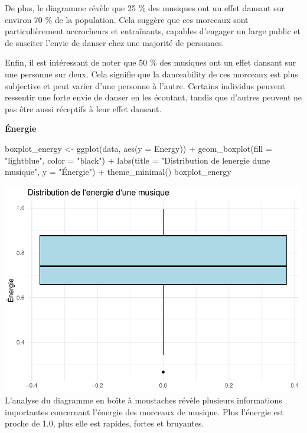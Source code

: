 \documentclass[
]{article}
\newenvironment{Shaded}{\begin{snugshade}}{\end{snugshade}}
\newcommand{\AttributeTok}[1]{\textcolor[rgb]{0.77,0.63,0.00}{#1}}
\newcommand{\FunctionTok}[1]{\textcolor[rgb]{0.00,0.00,0.00}{#1}}
\newcommand{\NormalTok}[1]{#1}
\newcommand{\OtherTok}[1]{\textcolor[rgb]{0.56,0.35,0.01}{#1}}
\newcommand{\SpecialCharTok}[1]{\textcolor[rgb]{0.00,0.00,0.00}{#1}}
\newcommand{\StringTok}[1]{\textcolor[rgb]{0.31,0.60,0.02}{#1}}
\begin{document}
De plus, le diagramme révèle que 25 \% des musiques ont un effet dansant
sur environ 70 \% de la population. Cela suggère que ces morceaux sont
particulièrement accrocheurs et entraînants, capables d'engager un large
public et de susciter l'envie de danser chez une majorité de personnes.

Enfin, il est intéressant de noter que 50 \% des musiques ont un effet
dansant sur une personne sur deux. Cela signifie que la danceability de
ces morceaux est plus subjective et peut varier d'une personne à
l'autre. Certains individus peuvent ressentir une forte envie de danser
en les écoutant, tandis que d'autres peuvent ne pas être aussi réceptifs
à leur effet dansant.

\textbf{Énergie}

\begin{Shaded}
\begin{Highlighting}[]
\NormalTok{boxplot\_energy }\OtherTok{\textless{}{-}} \FunctionTok{ggplot}\NormalTok{(data, }\FunctionTok{aes}\NormalTok{(}\AttributeTok{y =}\NormalTok{ Energy)) }\SpecialCharTok{+}
  \FunctionTok{geom\_boxplot}\NormalTok{(}\AttributeTok{fill =} \StringTok{"lightblue"}\NormalTok{, }\AttributeTok{color =} \StringTok{"black"}\NormalTok{) }\SpecialCharTok{+}
  \FunctionTok{labs}\NormalTok{(}\AttributeTok{title =} \StringTok{"Distribution de l\textquotesingle{}energie d\textquotesingle{}une musique"}\NormalTok{, }\AttributeTok{y =} \StringTok{"Énergie"}\NormalTok{) }\SpecialCharTok{+}
  \FunctionTok{theme\_minimal}\NormalTok{()}
\NormalTok{boxplot\_energy}
\end{Highlighting}
\end{Shaded}

\includegraphics{spotify_analysis_files/figure-latex/unnamed-chunk-6-1.pdf}
L'analyse du diagramme en boîte à moustaches révèle plusieurs
informations importantes concernant l'énergie des morceaux de musique.
Plus l'énergie est proche de 1.0, plus elle est rapides, fortes et
bruyantes.
\end{document}
